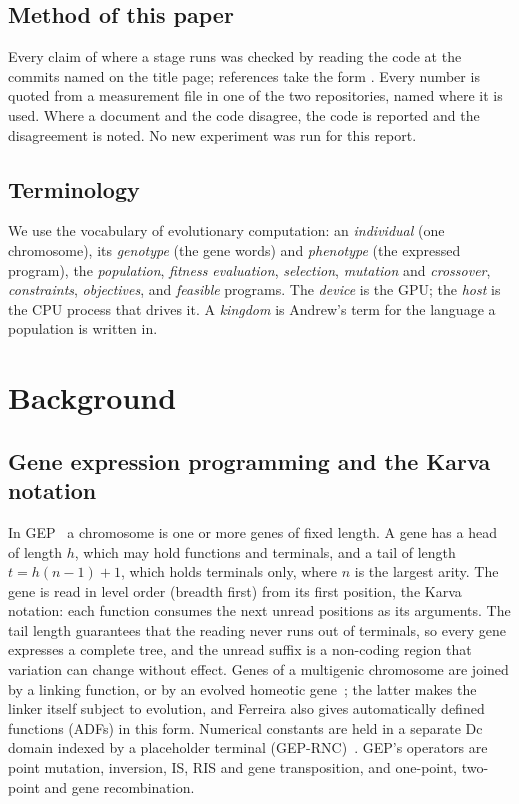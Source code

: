 \documentclass[11pt,a4paper]{report}
\newcommand{\src}[1]{{\footnotesize\path{#1}}}
\begin{document}
\section{Method of this paper}
Every claim of where a stage runs was checked by reading the code at the
commits named on the title page; references take the form
\src{repository/path:line}. Every number is quoted from a measurement file in one
of the two repositories, named where it is used. Where a document and the code
disagree, the code is reported and the disagreement is noted. No new
experiment was run for this report.

\section{Terminology}
We use the vocabulary of evolutionary computation: an \emph{individual} (one
chromosome), its \emph{genotype} (the gene words) and \emph{phenotype} (the
expressed program), the \emph{population}, \emph{fitness evaluation},
\emph{selection}, \emph{mutation} and \emph{crossover}, \emph{constraints},
\emph{objectives}, and \emph{feasible} programs. The \emph{device} is the GPU;
the \emph{host} is the CPU process that drives it. A \emph{kingdom} is Andrew's
term for the language a population is written in.

\chapter{Background}
\label{ch:background}

\section{Gene expression programming and the Karva notation}
In GEP~\cite{ferreira2001gep,ferreira2006book} a chromosome is one or more genes
of fixed length. A gene has a head of length $h$, which may hold functions and
terminals, and a tail of length $t=h(n-1)+1$, which holds terminals only, where
$n$ is the largest arity. The gene is read in level order (breadth first) from
its first position, the Karva notation: each function consumes the next
unread positions as its arguments. The tail length guarantees that the reading
never runs out of terminals, so every gene expresses a complete tree, and the
unread suffix is a non-coding region that variation can change without effect.
Genes of a multigenic chromosome are joined by a linking function, or by an
evolved homeotic gene~\cite{ferreira2006adf}; the latter makes the linker
itself subject to evolution, and Ferreira also gives automatically defined
functions (ADFs) in this form. Numerical constants are held in a separate Dc
domain indexed by a placeholder terminal (GEP-RNC)~\cite{ferreira2006book}.
GEP's operators are point mutation, inversion, IS, RIS and gene transposition,
and one-point, two-point and gene recombination.
\end{document}
